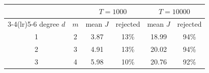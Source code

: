 \begin{tabular}{cccccc}
\toprule
& & \multicolumn{2}{c}{$T=1000$} & \multicolumn{2}{c}{$T=10000$} \\ \cmidrule(lr){3-4}\cmidrule(lr){5-6} degree $d$ & $m$ & mean $J$ & rejected & mean $J$ & rejected \\
\midrule
1 & 2 & 3.87 & 13\% & 18.99 & 94\% \\
2 & 3 & 4.91 & 13\% & 20.02 & 94\% \\
3 & 4 & 5.98 & 10\% & 20.76 & 92\% \\
\bottomrule
\end{tabular}
